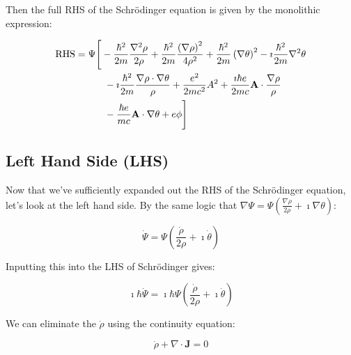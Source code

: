 Then the full RHS of the Schr\"odinger equation is given by the monolithic
expression:

\begin{align}
    \mathrm{RHS}
    &=  \Psi \Bigg[ - \frac{\hbar^2}{2m} \frac{\nabla^2 \rho}{2\rho} +
        \frac{\hbar^2}{2m} \frac{\left( \nabla \rho \right)^2}{4 \rho^2} +
        \frac{\hbar^2}{2m} \left( \nabla \theta \right)^2 - \imath
        \frac{\hbar^2}{2m} \nabla^2 \theta
        \notag \\
        & \hspace{30pt} - \imath \frac{\hbar^2}{2m} \frac{\nabla \rho \cdot \nabla
    \theta}{\rho} + \frac{e^2}{2mc^2} A^2 + \frac{\imath \hbar e}{2mc}
        \mathbf{A} \cdot \frac{\nabla \rho}{\rho} \\
      & \hspace{30pt} - \frac{\hbar e}{mc} \mathbf{A} \cdot \nabla \theta + e
        \phi \Bigg] \notag
\end{align}


\subsection{Left Hand Side (LHS)}
\label{sec:schroedinger/lhs}

Now that we've sufficiently expanded out the RHS of the Schr\"odinger equation,
let's look at the left hand side. By the same logic that $\nabla \Psi = \Psi
\left( \frac{\nabla \rho}{2\rho} + \imath \nabla \theta \right)$:

\begin{equation}
    \dot \Psi = \Psi \left( \frac{\dot \rho}{2\rho} + \imath \dot \theta \right)
    \label{eqn:psi-dot}
\end{equation}

Inputting this into the LHS of Schr\"odinger gives:

\begin{equation}
    \imath \hbar \dot \Psi = \imath \hbar \Psi \left( \frac{\dot \rho}{2\rho} +
    \imath \dot \theta \right)
\end{equation}

We can eliminate the $\dot \rho$ using the continuity equation:

\begin{equation}
    \dot \rho + \nabla \cdot \mathbf{J} = 0
    \label{eqn:continuity}
\end{equation}


